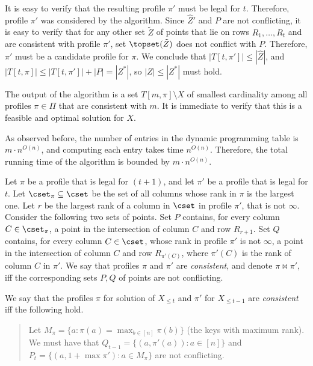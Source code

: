 \documentclass[11pt]{article}
\numberwithin{equation}{section}
\theoremstyle{definition}
\theoremstyle{plain}
\begin{document}
It is easy to verify that the resulting profile $\pi'$ must be legal for $t$. Therefore, profile $\pi'$ was considered by the algorithm. 
Since $\hat Z'$ and $P$ are not conflicting, it is easy to verify that for any other set $\tilde Z$ of points that lie on rows $R_1,\ldots,R_t$ and are consistent with profile $\pi'$, set $\topset(\tilde Z)$ does not conflict with $P$. Therefore, $\pi'$ must be a candidate profile for $\pi$. We conclude that $|T[t,\pi']|\leq |\hat Z|$, and  $|T[t,\pi]|\leq |T[t,\pi']|+|P|=|Z^*|$, so $|Z|\leq |Z^*|$ must hold.

The output of the algorithm is a set $T[m,\pi]\setminus X$ of smallest cardinality among all profiles $\pi\in \Pi$ that are consistent with $m$. It is immediate to verify that this is a feasible and optimal solution for $X$.

As observed before, the number of entries in the dynamic programming table is $m\cdot n^{O(n)}$, and computing each entry takes time $n^{O(n)}$. Therefore, the total running time of the algorithm is bounded by $m\cdot n^{O(n)}$.



\iffalse

%

Let $\pi$ be a profile that is legal for $(t+1)$, and let $\pi'$ be a profile that is legal for $t$. 
Let $\cset_{\pi}\subseteq \cset$ be the set of all columns whose rank in $\pi$ is the largest one.
Let $r$ be the largest rank of a column in $\cset$ in profile $\pi'$, that is not $\infty$.
Consider the following two sets of points. Set $P$ contains, for every column $C\in \cset_{\pi}$, a point in the intersection of column $C$ and row $R_{r+1}$. Set $Q$ contains, for every column $C\in \cset$, whose rank in profile $\pi'$ is not $\infty$, a point in the intersection of column $C$ and row $R_{\pi'(C)}$, where $\pi'(C)$ is the rank of column $C$ in $\pi'$. 
We say that profiles $\pi$ and $\pi'$ are \emph{consistent}, and denote $\pi \bowtie \pi'$, iff the corresponding sets $P,Q$ of points are not conflicting.




%
We say that the profiles $\pi$ for solution of $X_{\leq t}$ and $\pi'$ for $X_{\leq t-1}$ are \emph{consistent} iff the following hold.  



\begin{quote}
Let $M_{\pi} = \{a: \pi(a) = \max_{ b \in [n]} \pi(b)\}$ (the keys with maximum rank). 
We must have that $Q_{t-1}= \{(a, \pi'(a)): a \in [n]\}$ and $P_t= \{(a, 1+\max \pi'): a \in M_{\pi}\}$ are not conflicting. 
%
\end{quote}
\end{document}
